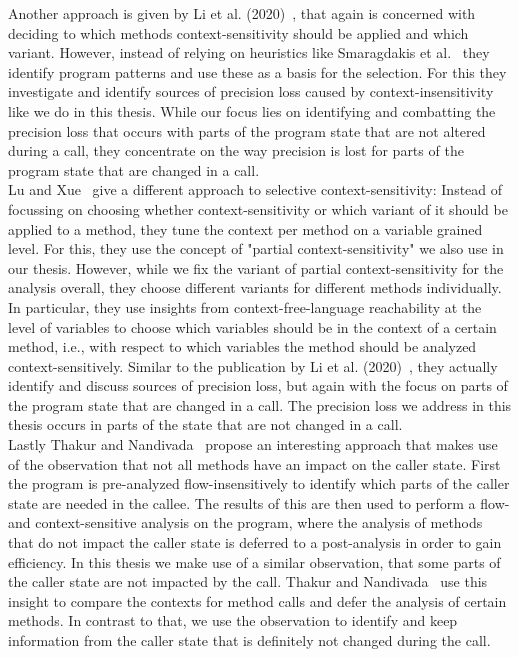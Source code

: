 Another approach is given by Li et al. (2020)~\parencite{li2020principled}, that again is concerned with deciding to which methods context-sensitivity should be applied and which variant. However, instead of relying on heuristics like Smaragdakis et al.~\parencite{smaragdakis2014introspective} they identify program patterns and use these as a basis for the selection. For this they investigate and identify sources of precision loss caused by context-insensitivity like we do in this thesis. While our focus lies on identifying and combatting the precision loss that occurs with parts of the program state that are not altered during a call, they concentrate on the way precision is lost for parts of the program state that are changed in a call.\\
Lu and Xue~\parencite{lu2019precision} give a different approach to selective context-sensitivity: Instead of focussing on choosing whether context-sensitivity or which variant of it should be applied to a method, they tune the context per method on a variable grained level. For this, they use the concept of "partial context-sensitivity" we also use in our thesis. However, while we fix the variant of partial context-sensitivity for the analysis overall, they choose different variants for different methods individually. In particular, they use insights from context-free-language reachability at the level of variables to choose which variables should be in the context of a certain method, i.e., with respect to which variables the method should be analyzed context-sensitively. Similar to the publication by Li et al. (2020)~\parencite{li2020principled}, they actually identify and discuss sources of precision loss, but again with the focus on parts of the program state that are changed in a call. The precision loss we address in this thesis occurs in parts of the state that are not changed in a call.\\
Lastly Thakur and Nandivada~\parencite{thakur2019compare} propose an interesting approach that makes use of the observation that not all methods have an impact on the caller state. First the program is pre-analyzed flow-insensitively to identify which parts of the caller state are needed in the callee. The results of this are then used to perform a flow- and context-sensitive analysis on the program, where the analysis of methods that do not impact the caller state is deferred to a post-analysis in order to gain efficiency. In this thesis we make use of a similar observation, that some parts of the caller state are not impacted by the call. Thakur and Nandivada~\parencite{thakur2019compare} use this insight to compare the contexts for method calls and defer the analysis of certain methods. In contrast to that, we use the observation to identify and keep information from the caller state that is definitely not changed during the call.\\
